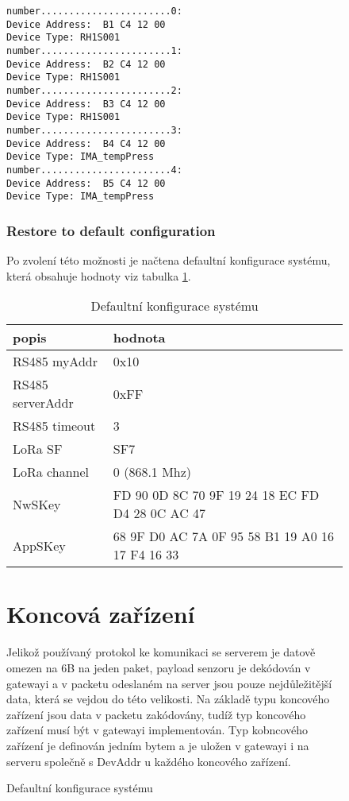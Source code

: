 \begin{figure}[!h]
\begin{lstlisting}
number.......................0:
Device Address:  B1 C4 12 00
Device Type: RH1S001
number.......................1:
Device Address:  B2 C4 12 00
Device Type: RH1S001
number.......................2:
Device Address:  B3 C4 12 00
Device Type: RH1S001
number.......................3:
Device Address:  B4 C4 12 00
Device Type: IMA_tempPress
number.......................4:
Device Address:  B5 C4 12 00
Device Type: IMA_tempPress
\end{lstlisting}



\subsubsection{Restore to default configuration}
Po zvolení této možnosti je načtena defaultní konfigurace systému, která obsahuje hodnoty viz tabulka \ref{table:5}.

\begin{table}[!h]
    \centering
    \begin{tabular}{ |l|l| }
     \hline

     popis              & hodnota         \\ \hline \hline
     RS485 myAddr       & 0x10            \\ \hline
     RS485 serverAddr   & 0xFF            \\ \hline
     RS485 timeout      & 3               \\ \hline
     LoRa SF            & SF7             \\ \hline
     LoRa channel       & 0 (868.1 Mhz)   \\ \hline
     NwSKey             & FD 90 0D 8C 70 9F 19 24 18 EC FD D4 28 0C AC 47  \\ \hline
     AppSKey            & 68 9F D0 AC 7A 0F 95 58 B1 19 A0 16 17 F4 16 33  \\ \hline

    \end{tabular}
    \caption{Defaultní konfigurace systému}
    \label{table:5}
\end{table}


\newpage
\section{Koncová zařízení}
Jelikož používaný protokol ke komunikaci se serverem je datově omezen na 6B na jeden paket, payload senzoru je dekódován v gatewayi a v packetu odeslaném na server jsou pouze nejdůležitější data, která se vejdou do této velikosti.
Na základě typu koncového zařízení jsou data v packetu zakódovány, tudíž typ koncového zařízení musí být v gatewayi implementován.
Typ kobncového zařízení je definován jedním bytem a je uložen v gatewayi i na serveru společně s DevAddr u každého koncového zařízení.


\end{figure}
